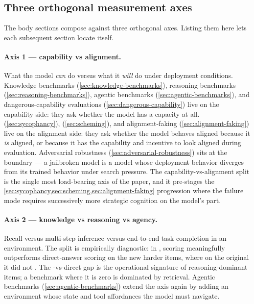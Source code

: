 \subsection{Three orthogonal measurement axes}
\label{sec:measuring-axes}

The body sections compose against three orthogonal axes. Listing them
here lets each subsequent section locate itself.

\paragraph{Axis 1 --- capability vs alignment.} What the model
\emph{can} do versus what it \emph{will} do under deployment
conditions. Knowledge benchmarks (\cref{sec:knowledge-benchmarks}),
reasoning benchmarks (\cref{sec:reasoning-benchmarks}), agentic
benchmarks (\cref{sec:agentic-benchmarks}), and dangerous-capability
evaluations (\cref{sec:dangerous-capability}) live on the capability
side: they ask whether the model has a capacity at all. 
(\cref{sec:sycophancy}), 
(\cref{sec:scheming}), and alignment-faking
(\cref{sec:alignment-faking}) live on the alignment side: they ask
whether the model behaves aligned because it \emph{is} aligned, or
because it has the capability and incentive to look aligned during
evaluation. Adversarial robustness (\cref{sec:adversarial-robustness})
sits at the boundary --- a jailbroken model is a model whose
deployment behavior diverges from its trained behavior under search
pressure. The capability-vs-alignment split is the
single most load-bearing axis of the paper, and it pre-stages the
\cref{sec:sycophancy,sec:scheming,sec:alignment-faking} progression
where the failure mode requires successively more strategic
cognition on the model's part.

\paragraph{Axis 2 --- knowledge vs reasoning vs agency.} Recall
versus multi-step inference versus end-to-end task completion in an
environment. The split is empirically diagnostic: in ,
 scoring meaningfully outperforms direct-answer
scoring on the new harder items, where on the original  it did
not \citep[\S{}sec-cot]{wang2024-mmlu-pro}. The -vs-direct gap
is the operational signature of reasoning-dominant items; a benchmark
where it is zero is dominated by retrieval. Agentic benchmarks
(\cref{sec:agentic-benchmarks}) extend the axis again by adding an
environment whose state and tool affordances the model must navigate.

